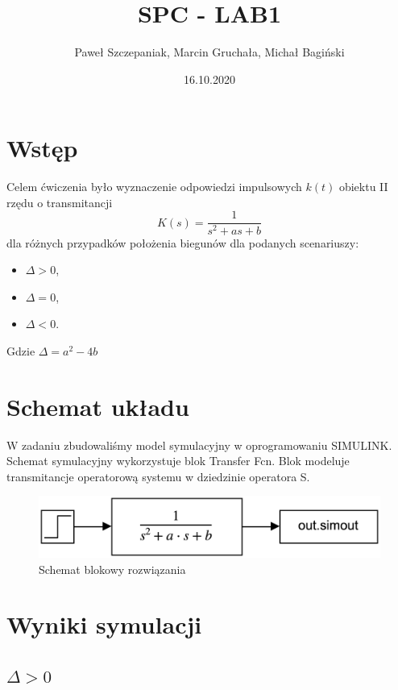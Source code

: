 \documentclass[a4paper]{article}
\title{SPC - LAB1}
\author{Paweł Szczepaniak, Marcin Gruchała, Michał Bagiński}
\date{16.10.2020}
\begin{document}
\maketitle

\section{Wstęp}
    Celem ćwiczenia było wyznaczenie odpowiedzi impulsowych $k(t)$ obiektu II rzędu o transmitancji
    $$
    K(s)=\dfrac{1}{s^2+as+b}
    $$
    dla różnych przypadków położenia biegunów dla podanych scenariuszy:
        \begin{itemize}
            \item $\Delta > 0$,
            \item $\Delta = 0$,
            \item $\Delta < 0$.
        \end{itemize}
    Gdzie $\Delta = a^2-4b$ 
\section{Schemat układu}
  W zadaniu zbudowaliśmy model symulacyjny w oprogramowaniu SIMULINK. Schemat symulacyjny wykorzystuje blok Transfer Fcn. Blok modeluje transmitancje operatorową systemu w dziedzinie operatora S. 
\begin{figure}[H]
    \centering
    \includegraphics[scale=0.35]{simulink.png}
    \caption{Schemat blokowy rozwiązania}
\end{figure}
\section{Wyniki symulacji}
\subsection{$\Delta > 0$}
\end{document}
